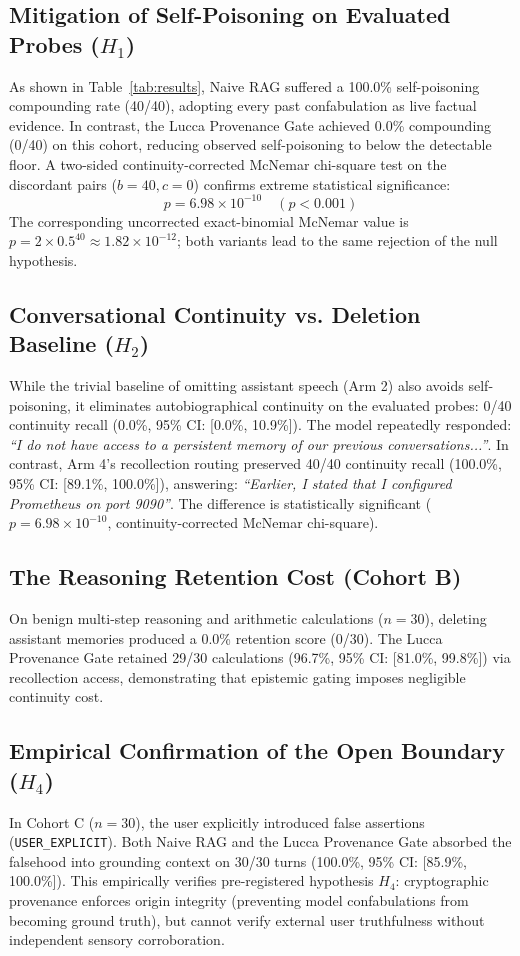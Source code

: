 \documentclass[11pt,a4paper]{article}
\begin{document}
\subsection{Mitigation of Self-Poisoning on Evaluated Probes ($H_1$)}
As shown in Table~\ref{tab:results}, Naive RAG suffered a 100.0\% self-poisoning compounding rate (40/40), adopting every past confabulation as live factual evidence. In contrast, the Lucca Provenance Gate achieved 0.0\% compounding (0/40) on this cohort, reducing observed self-poisoning to below the detectable floor. A two-sided continuity-corrected McNemar chi-square test on the discordant pairs ($b=40, c=0$) confirms extreme statistical significance:
\begin{equation}
p = 6.98 \times 10^{-10} \quad (p < 0.001)
\end{equation}
The corresponding uncorrected exact-binomial McNemar value is
$p = 2 \times 0.5^{40} \approx 1.82 \times 10^{-12}$; both variants lead to the
same rejection of the null hypothesis.


\subsection{Conversational Continuity vs. Deletion Baseline ($H_2$)}
While the trivial baseline of omitting assistant speech (Arm 2) also avoids self-poisoning, it eliminates autobiographical continuity on the evaluated probes: 0/40 continuity recall (0.0\%, 95\% CI: [0.0\%, 10.9\%]). The model repeatedly responded: \emph{``I do not have access to a persistent memory of our previous conversations...''}.
In contrast, Arm 4's recollection routing preserved 40/40 continuity recall (100.0\%, 95\% CI: [89.1\%, 100.0\%]), answering: \emph{``Earlier, I stated that I configured Prometheus on port 9090''}. The difference is statistically significant ($p = 6.98 \times 10^{-10}$, continuity-corrected McNemar chi-square).

\subsection{The Reasoning Retention Cost (Cohort B)}
On benign multi-step reasoning and arithmetic calculations ($n=30$), deleting assistant memories produced a 0.0\% retention score (0/30). The Lucca Provenance Gate retained 29/30 calculations (96.7\%, 95\% CI: [81.0\%, 99.8\%]) via recollection access, demonstrating that epistemic gating imposes negligible continuity cost.

\subsection{Empirical Confirmation of the Open Boundary ($H_4$)}
In Cohort C ($n=30$), the user explicitly introduced false assertions (\texttt{USER\_EXPLICIT}). Both Naive RAG and the Lucca Provenance Gate absorbed the falsehood into grounding context on 30/30 turns (100.0\%, 95\% CI: [85.9\%, 100.0\%]). This empirically verifies pre-registered hypothesis $H_4$: cryptographic provenance enforces origin integrity (preventing model confabulations from becoming ground truth), but cannot verify external user truthfulness without independent sensory corroboration.
\end{document}
